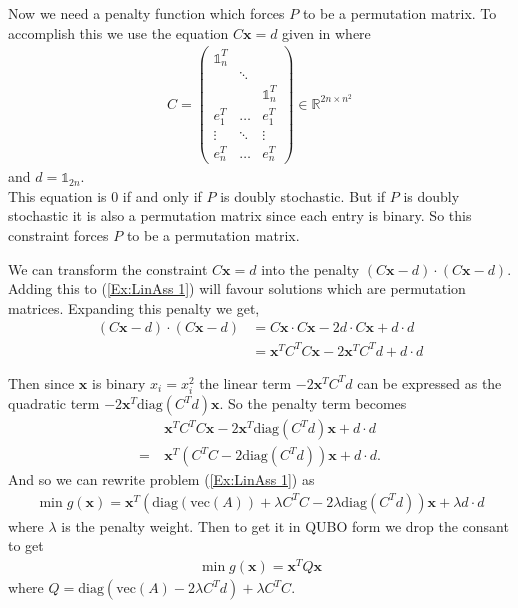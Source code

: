 \documentclass{article}
\begin{document}
\noindent Now we need a penalty function which forces \(P\) to be a permutation matrix. To accomplish this we use the equation \(C\mathbf{x} = d\) given in \cite[p.~8]{klus2023continuous} where 
\begin{align*}
    C = \begin{pmatrix}
        \mathbb{1}_n^T & & \\
         & \ddots & \\ 
         & & \mathbb{1}_n^T \\
         e_1^T & \hdots & e_1^T \\
         \vdots & \ddots & \vdots \\
         e_n^T & \hdots & e_n^T
    \end{pmatrix} \in \mathbb{R}^{2n \times n^2}
\end{align*}
and \(d = \mathbb{1}_{2n}\). \\
This equation is 0 if and only if \(P\) is doubly stochastic. But if \(P\) is doubly stochastic it is also a permutation matrix since each entry is binary. So this constraint forces \(P\) to be a permutation matrix.

\newpage
\noindent We can transform the constraint \(C\mathbf{x} = d\) into the penalty \((C\mathbf{x} - d) \cdot (C\mathbf{x} - d)\). Adding this to (\ref{Ex:LinAss 1}) will favour solutions which are  permutation matrices.
Expanding this penalty we get,
\begin{align*}
    (C\mathbf{x} - d) \cdot (C\mathbf{x} - d) &= C\mathbf{x} \cdot C\mathbf{x} - 2d\cdot C\mathbf{x} + d \cdot d \\
    &= \mathbf{x}^T C^T C \mathbf{x} -2\mathbf{x}^T C^T d + d\cdot d
\end{align*}

\noindent Then since \(\mathbf{x}\) is binary \(x_i = x_i^2\) the linear term \(-2\mathbf{x}^T C^T d\) can be expressed as the quadratic term \(-2\mathbf{x}^T\text{diag}(C^Td)\mathbf{x}\). So the penalty term becomes
\begin{align*}
    &\mathbf{x}^T C^T C \mathbf{x} -2\mathbf{x}^T\text{diag}(C^Td)\mathbf{x} + d\cdot d \\
    = \: &\mathbf{x}^T(C^T C -2\text{diag}(C^Td))\mathbf{x} + d\cdot d.
\end{align*}
And so we can rewrite problem (\ref{Ex:LinAss 1}) as 
\begin{align*}
    \min g(\mathbf{x}) = \mathbf{x}^T (\text{diag}(\text{vec}(A)) + \lambda C^T C - 2\lambda\text{diag}(C^T d))\mathbf{x} + \lambda d\cdot d
\end{align*}
where \(\lambda\) is the penalty weight. Then to get it in QUBO form we drop the consant to get
\begin{align*}
    \min g(\mathbf{x}) = \mathbf{x}^T Q \mathbf{x}
\end{align*}
where \(Q = \text{diag}(\text{vec}(A) - 2\lambda C^Td) + \lambda C^T C\).
\end{document}
